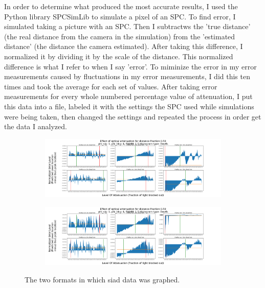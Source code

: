 \documentclass{beamer}
\begin{document}
\begin{frame}
  In order to determine what produced the most accurate results, I used the Python library SPCSimLib \cite{spc} to simulate a pixel of an SPC. To find error, I simulated taking a picture with an SPC. Then I subtractws the 'true distance' (the real distance from the camera in the simulation) from the 'estimated distance' (the distance the camera estimated). After taking this difference, I normalized it by dividing it by the scale of the distance. This normalized difference is what I refer to when I say 'error'. To miminize the error in my error measurements caused by fluctuations in my error measurements, I did this ten times and took the average for each set of values. After taking error measurements for every whole numbered percentage value of attenuation, I put this data into a file, labeled it with the settings the SPC used while simulations were being taken, then changed the settings and repeated the process in order get the data I analyzed. 
\end{frame}

\begin{frame}
  \begin{figure}[H]
    \centering
    \begin{subfigure}[b]{1\textwidth}
      \includegraphics[width=1\linewidth]{SharedyExample.png}
      \label{fig:Ng1}
    \end{subfigure}
    \begin{subfigure}[b]{1\textwidth}
      \includegraphics[width=1\linewidth]{ZoomedyExample.png}
      \label{fig:Ng2}
    \end{subfigure}
    \caption{\label{fig:Data}The two formats in which siad data was graphed.}
  \end{figure}
\end{frame}
\end{document}
